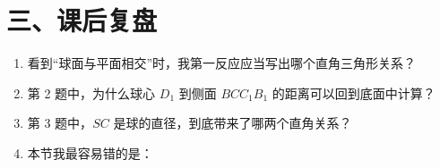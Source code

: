 \documentclass[11pt,a4paper]{ctexart}
\begin{document}
\newpage

\freequestionheader
\qSolidPyramidDiameterVolumeStem
\qSolidPyramidDiameterVolumeOptions
\begin{center}
  \qSolidPyramidDiameterVolumeFigure[1.1]
\end{center}

\newpage

\section*{三、课后复盘}

\begin{enumerate}[label=\arabic*. , leftmargin=2em, itemsep=1.2em]
  \item 看到“球面与平面相交”时，我第一反应应当写出哪个直角三角形关系？

  \vspace{1.0cm}

  \item 第 2 题中，为什么球心 $D_1$ 到侧面 $BCC_1B_1$ 的距离可以回到底面中计算？

  \vspace{1.2cm}

  \item 第 3 题中，$SC$ 是球的直径，到底带来了哪两个直角关系？

  \vspace{1.2cm}

  \item 本节我最容易错的是：\blank{10cm}

  \vspace{0.8cm}
\end{enumerate}
\end{document}
